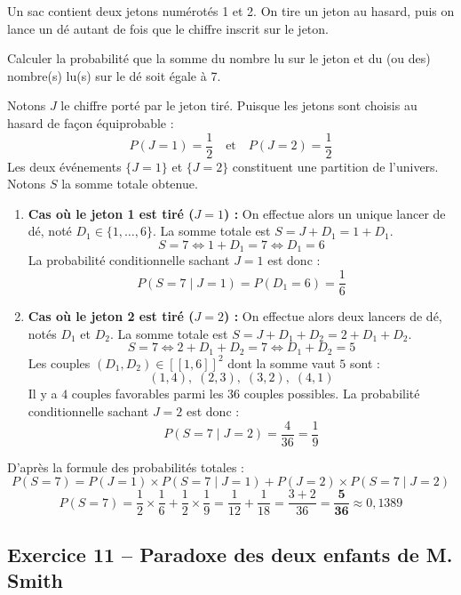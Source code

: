\documentclass[11pt,a4paper]{article}
\begin{document}
Un sac contient deux jetons numérotés 1 et 2. On tire un jeton au hasard, puis on lance un dé autant de fois que le chiffre inscrit sur le jeton.

Calculer la probabilité que la somme du nombre lu sur le jeton et du (ou des) nombre(s) lu(s) sur le dé soit égale à 7.

\begin{correctionbox}
Notons $J$ le chiffre porté par le jeton tiré. Puisque les jetons sont choisis au hasard de façon équiprobable :
\[
P(J = 1) = \frac{1}{2} \quad \text{et} \quad P(J = 2) = \frac{1}{2}
\]
Les deux événements $\{J = 1\}$ et $\{J = 2\}$ constituent une partition de l'univers.
Notons $S$ la somme totale obtenue.
\begin{enumerate}
    \item \textbf{Cas où le jeton 1 est tiré ($J = 1$) :}
    On effectue alors un unique lancer de dé, noté $D_1 \in \{1, \dots, 6\}$.
    La somme totale est $S = J + D_1 = 1 + D_1$.
    \[
    S = 7 \iff 1 + D_1 = 7 \iff D_1 = 6
    \]
    La probabilité conditionnelle sachant $J = 1$ est donc :
    \[
    P(S = 7 \mid J = 1) = P(D_1 = 6) = \frac{1}{6}
    \]

    \item \textbf{Cas où le jeton 2 est tiré ($J = 2$) :}
    On effectue alors deux lancers de dé, notés $D_1$ et $D_2$.
    La somme totale est $S = J + D_1 + D_2 = 2 + D_1 + D_2$.
    \[
    S = 7 \iff 2 + D_1 + D_2 = 7 \iff D_1 + D_2 = 5
    \]
    Les couples $(D_1, D_2) \in [\![1, 6]\!]^2$ dont la somme vaut $5$ sont :
    \[
    (1, 4), \; (2, 3), \; (3, 2), \; (4, 1)
    \]
    Il y a $4$ couples favorables parmi les $36$ couples possibles. La probabilité conditionnelle sachant $J = 2$ est donc :
    \[
    P(S = 7 \mid J = 2) = \frac{4}{36} = \frac{1}{9}
    \]
\end{enumerate}
D'après la formule des probabilités totales :
\[
P(S = 7) = P(J = 1) \times P(S = 7 \mid J = 1) + P(J = 2) \times P(S = 7 \mid J = 2)
\]
\[
P(S = 7) = \frac{1}{2} \times \frac{1}{6} + \frac{1}{2} \times \frac{1}{9} = \frac{1}{12} + \frac{1}{18} = \frac{3 + 2}{36} = \mathbf{\frac{5}{36}} \approx 0{,}1389
\]
\end{correctionbox}

\vspace{0.3cm}

\subsection*{Exercice 11 -- Paradoxe des deux enfants de M. Smith}
\end{document}
